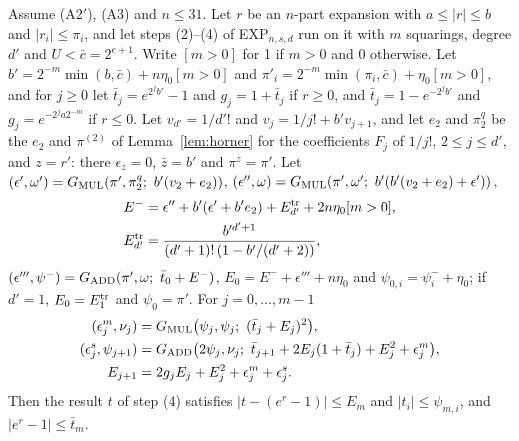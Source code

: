 \begin{lemma}\label{lem:core}
Assume (A2$'$), (A3) and $n \le 31$. Let $r$ be an $n$-part expansion with $a
\le |r| \le b$ and $|r_i| \le \pi_i$, and let steps (2)--(4) of EXP$_{n,s,d}$ run on it with $m$ squarings, degree $d'$
and $U < \bar c = 2^{e+1}$. Write $[m > 0]$ for 1 if $m > 0$ and 0 otherwise. Let $b' = 2^{-m}\min(b, \bar c) +
n\eta_0[m > 0]$ and $\pi'_i = 2^{-m}\min(\pi_i, \bar c) + \eta_0[m > 0]$, and for $j \ge 0$ let $\bar t_j = e^{2^jb'} - 1$
and $g_j = 1 + \bar t_j$ if $r \ge 0$, and $\bar t_j = 1 - e^{-2^jb'}$ and $g_j = e^{-2^ja2^{-m}}$ if $r \le 0$. Let
$v_{d'} = 1/d'!$ and $v_j = 1/j! + b'v_{j+1}$, and let $e_2$ and $\pi^q_2$ be the $e_2$ and $\pi^{(2)}$ of
Lemma~\ref{lem:horner} for the coefficients $F_j$ of $1/j!$, $2 \le j \le d'$, and $z = r'$: there $\epsilon_z = 0$,
$\bar z = b'$ and $\pi^z = \pi'$. Let $(\epsilon', \omega') = G_{\rm MUL}(\pi', \pi^q_2;\ b'(v_2 + e_2))$, $(\epsilon'', \omega) = G_{\rm MUL}(\pi',
\omega';\ b'(b'(v_2 + e_2) + \epsilon'))$,
\begin{align*}
E^- &= \epsilon'' + b'(\epsilon' + b'e_2) + E^{\rm tr}_{d'} + 2n\eta_0[m > 0], \\
E^{\rm tr}_{d'} &= \frac{b'^{d'+1}}{(d'+1)!\,(1 - b'/(d'+2))},
\end{align*}
$(\epsilon''', \psi^-) = G_{\rm ADD}(\pi', \omega;\ \bar t_0 + E^-)$, $E_0 = E^- + \epsilon''' + n\eta_0$ and $\psi_{0,i}
= \psi^-_i + \eta_0$; if $d' = 1$, $E_0 = E^{\rm tr}_1$ and $\psi_0 = \pi'$. For $j = 0, \dots, m-1$
\begin{align*}
(\epsilon^m_j, \nu_j) &= G_{\rm MUL}\bigl(\psi_j, \psi_j;\ (\bar t_j + E_j)^2\bigr), \\
(\epsilon^s_j, \psi_{j+1}) &= G_{\rm ADD}\bigl(2\psi_j, \nu_j;\ \bar t_{j+1} + 2E_j(1 + \bar t_j) + E_j^2 + \epsilon^m_j\bigr),
\\
E_{j+1} &= 2g_jE_j + E_j^2 + \epsilon^m_j + \epsilon^s_j.
\end{align*}
Then the result $t$ of step (4) satisfies $|t - (e^r - 1)| \le E_m$ and $|t_i| \le \psi_{m,i}$, and $|e^r - 1| \le
\bar t_m$.
\end{lemma}

